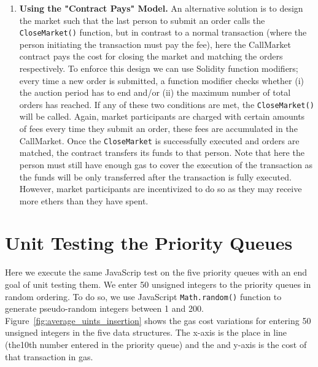 \begin{enumerate}
\item \textbf{Using the "Contract Pays" Model.} An alternative solution is to design the market such that the last person to submit an order calls the \texttt{CloseMarket()} function, but in contrast to a normal transaction (where the person initiating the transaction must pay the fee), here the CallMarket contract pays the cost for closing the market and matching the orders respectively. To enforce this design we can use Solidity function modifiers; every time a new order is submitted, a function modifier checks whether (i) the auction period has to end and/or (ii) the maximum number of total orders has reached. If any of these two conditions are met, the \texttt{CloseMarket()} will be called. Again, market participants are charged with certain amounts of fees every time they submit an order, these fees are accumulated in the CallMarket. Once the \texttt{CloseMarket} is successfully executed and orders are matched, the contract transfers its funds to that person. Note that here the person must still have enough gas to cover the execution of the transaction as the funds will be only transferred after the transaction is fully executed. However, market participants are incentivized to do so as they may receive more ethers than they have spent.

\end{enumerate}



\section{Unit Testing the Priority Queues}

Here we execute the same JavaScrip test on the five priority queues with an end goal of unit testing them. We enter 50 unsigned integers to the priority queues in random ordering. To do so, we use JavaScript \texttt{Math.random()} function to generate pseudo-random integers between 1 and 200. Figure~\ref{fig:average_uints_insertion} shows the gas cost variations for entering 50 unsigned integers in the five data structures. The x-axis is the place in line (\eg the10th number entered in the priority queue) and the and y-axis is the cost of that transaction in gas. 


